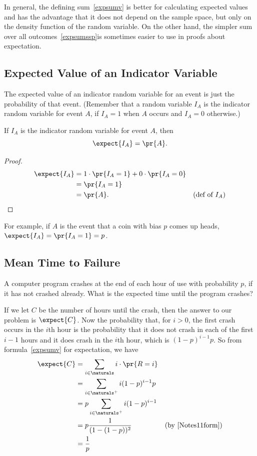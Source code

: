 In general, the defining sum~\eqref{expsumv} is better for calculating
expected values and has the advantage that it does not depend on the
sample space, but only on the density function of the random variable.  On
the other hand, the simpler sum over all outcomes~\eqref{expsumssp}is
sometimes easier to use in proofs about expectation.

\subsection{Expected Value of an Indicator Variable}

The expected value of an indicator random variable for an event is
just the probability of that event.  (Remember that a random variable
$I_A$ is the indicator random variable for event $A$, if $I_A = 1$
when $A$ occurs and $I_A= 0$ otherwise.)
\begin{lemma}\label{expindic}
If $I_A$ is the indicator random variable for event $A$, then
\[
\expect{I_A} = \pr{A}.
\]
\end{lemma}

\begin{proof}
\begin{align*}
\expect{I_A} 
& =  1 \cdot \pr{I_A = 1} + 0 \cdot \pr{I_A = 0} 
& 
\\
& = \pr{I_A = 1}
\\
& =  \pr{A}. & \text{(def of $I_A$)}
\end{align*}
\end{proof}
For example, if $A$ is the event that a coin
with bias $p$ comes up heads, $\expect{I_A} = \pr{I_A=1} = p$.


\subsection{Mean Time to Failure}

A computer program crashes at the end of each hour of use with probability
$p$, if it has not crashed already.  What is the expected time until the
program crashes?

If we let $C$ be the number of hours until the crash, then the answer to
our problem is $\expect{C}$.  Now the probability that, for $i >0$, the
first crash occurs in the $i$th hour is the probability that it does not
crash in each of the first $i-1$ hours and it does crash in the $i$th
hour, which is $(1-p)^{i-1}p$.  So from formula~\eqref{expsumv} for
expectation, we have
\begin{align*}
\expect{C} & = \sum_{i \in \naturals} i \cdot \pr{R=i}\\
           & = \sum_{i \in \naturals^+} i (1-p)^{i-1}p\\
           &= p \sum_{i \in \naturals^+} i (1-p)^{i-1}\\
           &= p\frac{1}{(1-(1-p))^2} & \text{(by~\eqref{Notes11form})}\\
           &= \frac{1}{p}
\end{align*}

